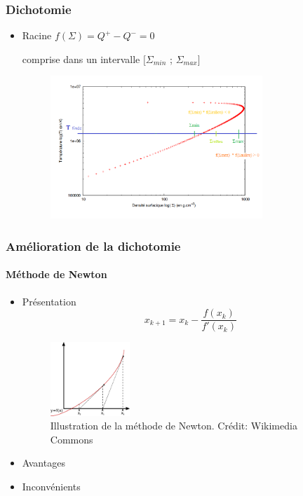 \documentclass[french]{beamer}
\begin{document}

\begin{frame}
\frametitle{Dichotomie}

   \begin{itemize}
      \item Racine $f(\Sigma) = Q^+ - Q^- = 0$ 
      
      comprise dans un intervalle $[\Sigma_{min}$ ; $\Sigma_{max}]$
      \\
      \begin{figure}[htb!]
         \includegraphics[width=8cm]{figures/dicho_2.png}
      \end{figure}
   \end{itemize}
\end{frame}



\begin{frame}
\frametitle{Amélioration de la dichotomie}
\framesubtitle{Méthode de Newton}

   \begin{itemize}
      \item Présentation
      \\
      \begin{equation}
         x_{k+1} = x_k - \frac{f(x_k)}{f'(x_k)}
      \end{equation}

      \begin{figure}[htb!]
         \includegraphics[width=3cm]{figures/Newton_method.png}
         \caption{Illustration de la méthode de Newton. Crédit: Wikimedia Commons}
      \end{figure}
      
      \item Avantages
      \item Inconvénients
   \end{itemize}
\end{frame}
\end{document}
